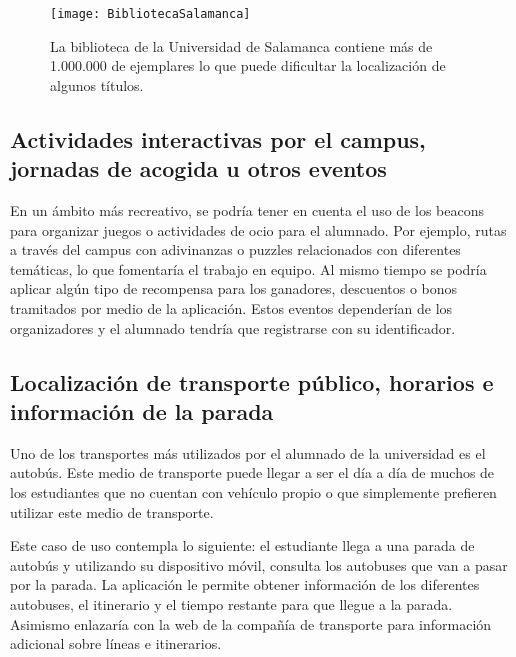 \begin{figure}[H]
	\centering
	\texttt{[image: BibliotecaSalamanca]}
	\caption{La biblioteca de la Universidad de Salamanca contiene más de 1.000.000 de ejemplares lo que puede dificultar la localización de algunos títulos.}
	\label{fig:bibliotecaUSAL}
\end{figure}

\subsection{Actividades interactivas por el campus, jornadas de acogida u otros eventos}

En un ámbito más recreativo, se podría tener en cuenta el uso de los beacons para organizar juegos o actividades de ocio para el alumnado. Por ejemplo, rutas a través del campus con adivinanzas o puzzles relacionados con diferentes temáticas, lo que fomentaría el trabajo en equipo. Al mismo tiempo se podría aplicar algún tipo de recompensa para los ganadores, descuentos o bonos tramitados por medio de la aplicación. Estos eventos dependerían de los organizadores y el alumnado tendría que registrarse con su identificador. 

\subsection{Localización de transporte público, horarios e \\información de la parada}

Uno de los transportes más utilizados por el alumnado de la universidad es el autobús. Este medio de transporte puede llegar a ser el día a día de muchos de los estudiantes que no cuentan con vehículo propio o que simplemente prefieren utilizar este medio de transporte. 

Este caso de uso contempla lo siguiente: el estudiante llega a una parada de autobús y utilizando su dispositivo móvil, consulta los autobuses que van a pasar por la parada. La aplicación le permite obtener información de los diferentes autobuses, el itinerario y el tiempo restante para que llegue a la parada.  Asimismo enlazaría con la web de la compañía de transporte para información adicional sobre líneas e itinerarios.
